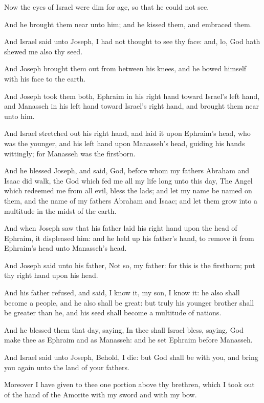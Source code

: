 \verse Now the eyes of Israel were dim for age, so that he could not see.

And he brought them near unto him; and he kissed them, and embraced them.

\verse And Israel said unto Joseph, I had not thought to see thy face: and, lo, God hath shewed me also thy seed.

\verse And Joseph brought them out from between his knees, and he bowed himself with his face to the earth.

\verse And Joseph took them both, Ephraim in his right hand toward Israel's left hand, and Manasseh in his left hand toward Israel's right hand, and brought them near unto him.

\verse And Israel stretched out his right hand, and laid it upon Ephraim's head, who was the younger, and his left hand upon Manasseh's head, guiding his hands wittingly; for Manasseh was the firstborn.

\verse And he blessed Joseph, and said, God, before whom my fathers Abraham and Isaac did walk, the God which fed me all my life long unto this day, \verse The Angel which redeemed me from all evil, bless the lads; and let my name be named on them, and the name of my fathers Abraham and Isaac; and let them grow into a multitude in the midst of the earth.

\verse And when Joseph saw that his father laid his right hand upon the head of Ephraim, it displeased him: and he held up his father's hand, to remove it from Ephraim's head unto Manasseh's head.

\verse And Joseph said unto his father, Not so, my father: for this is the firstborn; put thy right hand upon his head.

\verse And his father refused, and said, I know it, my son, I know it: he also shall become a people, and he also shall be great: but truly his younger brother shall be greater than he, and his seed shall become a multitude of nations.

\verse And he blessed them that day, saying, In thee shall Israel bless, saying, God make thee as Ephraim and as Manasseh: and he set Ephraim before Manasseh.

\verse And Israel said unto Joseph, Behold, I die: but God shall be with you, and bring you again unto the land of your fathers.

\verse Moreover I have given to thee one portion above thy brethren, which I took out of the hand of the Amorite with my sword and with my bow.

